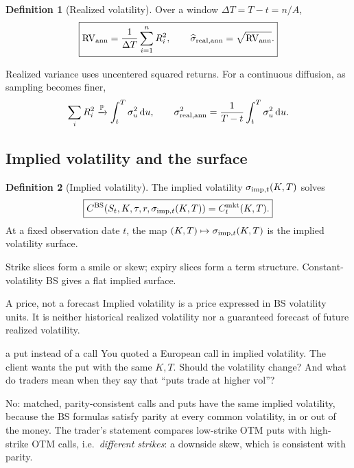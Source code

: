 \documentclass[10pt]{article}
\newcommand{\Pp}{\mathbb P}
\newcommand{\1}{\mathbf 1}
\newcommand{\dd}{\,\mathrm d}
\theoremstyle{definition}
\newtheorem{definition}{Definition}[section]
\begin{document}
\begin{definition}[Realized volatility]
Over a window \(\Delta T=T-t=n/A\),
\[
\boxed{\mathrm{RV}_{\rm ann}=\frac1{\Delta T}\sum_{i=1}^nR_i^2,\qquad
\widehat\sigma_{\rm real,ann}=\sqrt{\mathrm{RV}_{\rm ann}}.}
\]
\end{definition}

Realized variance uses uncentered squared returns. For a continuous diffusion,
as sampling becomes finer,
\[
\sum_iR_i^2\xrightarrow{\Pp}\int_t^T\sigma_u^2\dd u,
\qquad \sigma_{\rm real,ann}^2=\frac1{T-t}\int_t^T\sigma_u^2\dd u.
\]

\subsection{Implied volatility and the surface}

\begin{definition}[Implied volatility]
The implied volatility \(\sigma_{{\rm imp},t}(K,T)\) solves
\[
\boxed{C^{\rm BS}(S_t,K,\tau,r,\sigma_{{\rm imp},t}(K,T))=C_t^{\rm mkt}(K,T).}
\]
At a fixed observation date \(t\), the map
\((K,T)\mapsto\sigma_{{\rm imp},t}(K,T)\) is the implied volatility surface.
\end{definition}

Strike slices form a smile or skew; expiry slices form a term structure.
Constant-volatility BS gives a flat implied surface.

\begin{warningbox}{A price, not a forecast}
Implied volatility is a price expressed in BS volatility units. It is neither
historical realized volatility nor a guaranteed forecast of future realized
volatility.
\end{warningbox}

\begin{studentexercise}{a put instead of a call}
You quoted a European call in implied volatility. The client wants the put
with the same \(K,T\). Should the volatility change? And what do traders mean
when they say that ``puts trade at higher vol''?
\end{studentexercise}
\begin{shortsolution}
No: matched, parity-consistent calls and puts have the same implied
volatility, because the BS formulas satisfy parity at every common
volatility, in or out of the money. The trader's statement compares
low-strike OTM puts with high-strike OTM calls, i.e.\ \emph{different
strikes}: a downside skew, which is consistent with parity.
\end{shortsolution}
\end{document}
